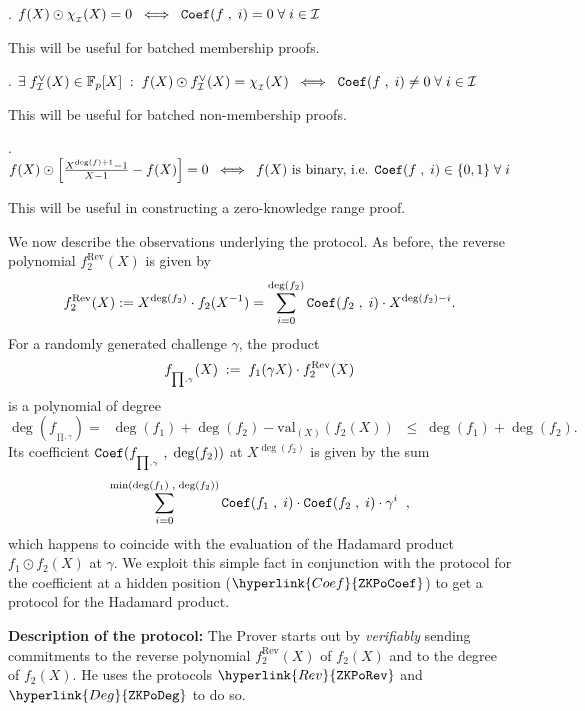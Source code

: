 \documentclass[11pt, lettersize, notitlepage, leqno, footskip=0.6cm]{article}
\newcommand{\bFp}{\mathbb{F}_p}
\newcommand{\LRA}{\Longleftrightarrow}
\newcommand{\mc}{\mathcal}
\newcommand{\mr}{\mathrm}
\newcommand{\vs}{\vspace{-0.15cm}}
\newcommand{\noin}{\noindent}
\numberwithin{equation}{section}
\begin{document}
\noin 1. $f(X)\odot \chi_{_\mc{I}}(X) = 0\;\;\LRA \;\; {\tt{Coef}}(f\;,\;i)= 0\;\forall\; i\in\mc{I}$ 

\vspace{1mm}

\noin This will be useful for batched membership proofs. \vspace{2mm}

\noin 2. $\exists \; f_{\mc{I}}^{\vee}(X)\in \bFp[X]\;:\; f(X)\odot f_{\mc{I}}^{\vee}(X) = \chi_{_\mc{I}}(X)\;\;\LRA\;\; {\tt{Coef}}(f\;,\;i)\neq 0\;\forall\; i\in\mc{I}$ \vspace{1mm}

\noin This will be useful for batched non-membership proofs. \vspace{2mm}

\noin 3. $f(X)\odot \Big[\frac{X^{\deg(f)+1}-1}{X-1} - f(X)\Big] = 0 \;\;\LRA\;\; f(X) \text{ is binary, i.e. }{\tt{Coef}}(f\;,\;i)\in \{0,1\}\;\forall\; i$ \vspace{1mm}

\noin This will be useful in constructing a zero-knowledge range proof. \vspace{2mm}

\vspace{3mm}




We now describe the observations underlying the protocol. As before, the reverse polynomial $f_2^{\mr{Rev}}(X)$ is given by  \vs $$ f_2^{\mr{Rev}}(X):= X^{\deg(f_2)}\cdot f_2(X^{-1}) = \sum\limits_{i=0}^{\deg(f_2)} {\tt{Coef}}(f_2\;,\;i)  \cdot X^{\deg(f_2)-i}. \vs $$ For a randomly generated challenge $\gamma$, the product \vs $$f_{_{\prod,\gamma}}(X)\;:=\; f_1(\gamma X)\cdot f_2^{\mr{Rev}}(X) \vs $$ is a polynomial of degree $$ \deg(f_{_{\prod,\gamma}}) =\;\; \deg(f_1)+\deg(f_2) - \mr{val}_{(X)}(f_2(X)) \;\;\leq\; \deg(f_1)+\deg(f_2) . $$ Its coefficient ${\tt{Coef}}(f_{_{\prod,\gamma}}\;,\;\deg(f_2))$ at $X^{\deg(f_2)}$ is given by the sum \vs $$ \sum\limits_{i=0}^{\min(\deg(f_1)\;,\;\deg(f_2))} {\tt{Coef}}(f_1\;,\;i)\cdot {\tt{Coef}}(f_2\;,\;i)\cdot \gamma^i\;\;, $$ which happens to coincide with the evaluation of the Hadamard product $f_1\odot f_2(X)$ at $\gamma$. We exploit this simple fact in conjunction with the protocol for the coefficient at a hidden position ($\hyperlink{Coef}{\tt{ZKPoCoef}}$) to get a protocol for the Hadamard product. \vspace{2mm}


\noin \textbf{Description of the protocol:} The Prover starts out by \textit{verifiably} sending commitments to the reverse polynomial $f_2^{\mr{Rev}}(X)$ of $f_2(X)$ and to the degree of $f_2(X)$. He uses the protocols $\hyperlink{Rev}{\tt{ZKPoRev}}$ and $\hyperlink{Deg}{\tt{ZKPoDeg}}$ to do so. 
\end{document}
